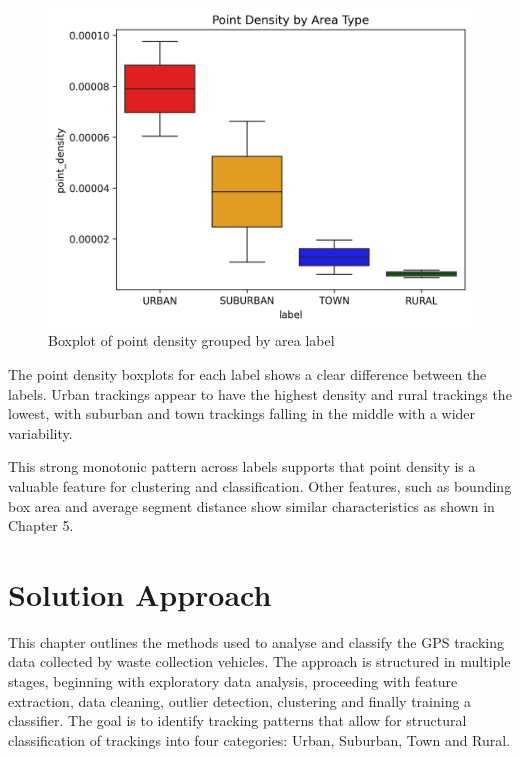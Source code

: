 \documentclass[a4paper,12pt,twoside]{scrreprt}
\begin{document}
\begin{figure}[h]
  \centering

  \includegraphics[width=\textwidth]{Figures/sample_point_density_boxplot.png}
  \caption{Boxplot of point density grouped by area label}
  \label{fig:sample_boxplot}
\end{figure}
\FloatBarrier

The point density boxplots for each label shows a clear difference between the
labels. Urban trackings appear to have the highest density and rural trackings
the lowest, with suburban and town trackings falling in the middle with a wider
variability.

This strong monotonic pattern across labels supports that point density is a
valuable feature for clustering and classification. Other features, such as
bounding box area and average segment distance	 show similar characteristics
as shown in Chapter 5.

\section{Solution Approach}
This chapter outlines the methods used to analyse and classify the GPS tracking
data collected by waste collection vehicles.
The approach is structured in multiple stages, beginning with exploratory data
analysis, proceeding with feature extraction, data cleaning, outlier detection,
clustering and finally training a classifier.
The goal is to identify tracking patterns that allow for structural
classification of trackings into four categories: Urban, Suburban, Town and
Rural.
\end{document}
